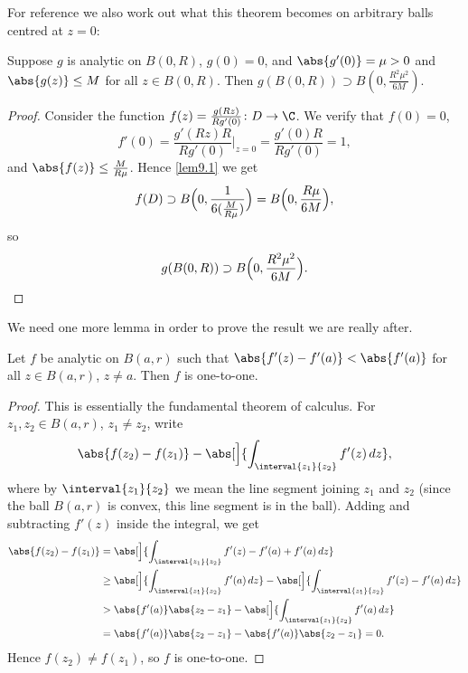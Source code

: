 For reference we also work out what this theorem becomes on arbitrary balls centred at $z = 0$:

\begin{lemma}\label{lem9.2}
	Suppose $g$ is analytic on $B(0, R)$, $g(0) = 0$, and $\abs{g'(0)} = \mu > 0$ and $\abs{g(z)} \leq M$ for all $z \in B(0, R)$.
	Then $g(B(0, R)) \supset B(0, \frac{R^2 \mu^2}{6 M})$.
\end{lemma}

\begin{proof}
	Consider the function $f(z) = \frac{g(R z)}{R g'(0)} \colon D \to \C$.
	We verify that $f(0) = 0$,
	\[
		f'(0) = \frac{g'(R z) R}{R g'(0)} \biggr\rvert_{z = 0} = \frac{g'(0) R}{R g'(0)} = 1,
	\]
	and $\abs{f(z)} \leq \frac{M}{R \mu}$.
	Hence \autoref{lem9.1} we get
	\[
		f(D) \supset B\Bigl( 0, \frac{1}{6 (\frac{M}{R \mu})} \Bigr) = B\Bigl( 0, \frac{R \mu}{6 M} \Bigr),
	\]
	so
	\[
		g(B(0, R)) \supset B\Bigl( 0, \frac{R^2 \mu^2}{6 M} \Bigr). \qedhere
	\]
\end{proof}

We need one more lemma in order to prove the result we are really after.

\begin{lemma}\label{lem9.3}
	Let $f$ be analytic on $B(a, r)$ such that $\abs{f'(z) - f'(a)} < \abs{f'(a)}$ for all $z \in B(a, r)$, $z \neq a$.
	Then $f$ is one-to-one.
\end{lemma}

\begin{proof}
	This is essentially the fundamental theorem of calculus.
	For $z_1, z_2 \in B(a, r)$, $z_1 \neq z_2$, write
	\[
		\abs{f(z_2) - f(z_1)} - \abs[\Big]{\int_{\interval{z_1}{z_2}} f'(z) \, d z},
	\]
	where by $\interval{z_1}{z_2}$ we mean the line segment joining $z_1$ and $z_2$ (since the ball $B(a, r)$ is convex, this line segment is in the ball).
	Adding and subtracting $f'(z)$ inside the integral, we get
	\begin{align*}
		\abs{f(z_2) - f(z_1)} &= \abs[\Big]{\int_{\interval{z_1}{z_2}} f'(z) - f'(a) + f'(a) \, d z} \\
		&\geq \abs[\Big]{\int_{\interval{z_1}{z_2}} f'(a) \, d z} - \abs[\Big]{\int_{\interval{z_1}{z_2}} f'(z) - f'(a) \, d z} \\
		&> \abs{f'(a)} \abs{z_2 - z_1} - \abs[\Big]{\int_{\interval{z_1}{z_2}} f'(a) \, d z} \\
		&= \abs{f'(a)} \abs{z_2 - z_1} - \abs{f'(a)} \abs{z_2 - z_1} = 0.
	\end{align*}
	Hence $f(z_2) \neq f(z_1)$, so $f$ is one-to-one.
\end{proof}

